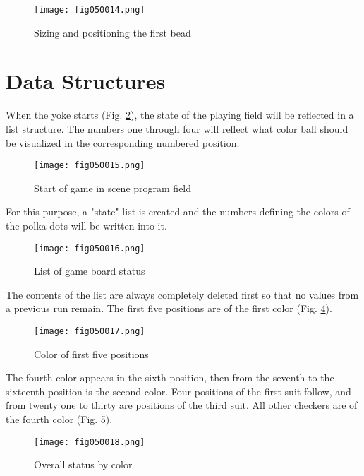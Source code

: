 \begin{figure}[H]
   \centering
   \texttt{[image: fig050014.png]}
   \caption{Sizing and positioning the first bead}
\label{fig050014}
\end{figure}

\section{Data Structures}

When the yoke starts (Fig. \ref{fig050015}), the state of the playing field will be reflected in a list structure. The numbers one through four will reflect what color ball should be visualized in the corresponding numbered position.

\begin{figure}[H]
   \centering
   \texttt{[image: fig050015.png]}
   \caption{Start of game in scene program field}
\label{fig050015}
\end{figure}

For this purpose, a "state" list is created and the numbers defining the colors of the polka dots will be written into it.

\begin{figure}[H]
   \centering
   \texttt{[image: fig050016.png]}
   \caption{List of game board status}
\label{fig050016}
\end{figure}

The contents of the list are always completely deleted first so that no values from a previous run remain. The first five positions are of the first color (Fig. \ref{fig050017}).

\begin{figure}[H]
   \centering
   \texttt{[image: fig050017.png]}
   \caption{Color of first five positions}
\label{fig050017}
\end{figure}

The fourth color appears in the sixth position, then from the seventh to the sixteenth position is the second color. Four positions of the first suit follow, and from twenty one to thirty are positions of the third suit. All other checkers are of the fourth color (Fig. \ref{fig050018}).

\begin{figure}[H]
   \centering
   \texttt{[image: fig050018.png]}
   \caption{Overall status by color}
\label{fig050018}
\end{figure}

